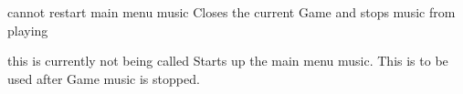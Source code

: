 
\begin{DoxyRefList}
\item[\label{bug__bug000001}%
\hypertarget{bug__bug000001}{}%
Member \hyperlink{class_game_screen_af2a5d4c707d0d0f47201eec498b77bd6}{Game\-Screen\-:\-:close\-Event} (Q\-Close\-Event $\ast$)]cannot restart main menu music Closes the current Game and stops music from playing  
\item[\label{bug__bug000002}%
\hypertarget{bug__bug000002}{}%
Member \hyperlink{class_main_window_ab622d7f3b4082b8221185e216991e602}{Main\-Window\-:\-:play\-Again} ()]this is currently not being called Starts up the main menu music. This is to be used after Game music is stopped. 
\end{DoxyRefList}